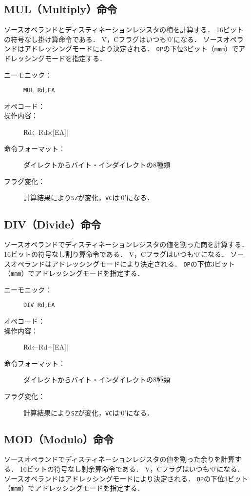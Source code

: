 \subsection{MUL（Multiply）命令}
ソースオペランドとディスティネーションレジスタの積を計算する．
16ビットの符号なし掛け算命令である．
V，Cフラグはいつも`0'になる．
ソースオペランドはアドレッシングモードにより決定される．
\texttt{OP}の下位3ビット（\texttt{mmm}）でアドレッシングモードを指定する．

\begin{description}
\item[ニーモニック：] \texttt{MUL Rd,EA}
\item[オペコード：] 
\item[操作内容：] \|Rd←Rd×[EA]|
\item[命令フォーマット：] ダイレクトからバイト・インダイレクトの8種類
\item[フラグ変化：] 計算結果により\texttt{SZ}が変化，\texttt{VC}は`0'になる．
\end{description}

\subsection{DIV（Divide）命令}
ソースオペランドでディスティネーションレジスタの値を割った商を計算する．
16ビットの符号なし割り算命令である．
V，Cフラグはいつも`0'になる．
ソースオペランドはアドレッシングモードにより決定される．
\texttt{OP}の下位3ビット（\texttt{mmm}）でアドレッシングモードを指定する．

\begin{description}
\item[ニーモニック：] \texttt{DIV Rd,EA}
\item[オペコード：] 
\item[操作内容：] \|Rd←Rd÷[EA]|
\item[命令フォーマット：] ダイレクトからバイト・インダイレクトの8種類
\item[フラグ変化：] 計算結果により\texttt{SZ}が変化，\texttt{VC}は`0'になる．
\end{description}

\subsection{MOD（Modulo）命令}
ソースオペランドでディスティネーションレジスタの値を割った余りを計算する．
16ビットの符号なし剰余算命令である．
V，Cフラグはいつも`0'になる．
ソースオペランドはアドレッシングモードにより決定される．
\texttt{OP}の下位3ビット（\texttt{mmm}）でアドレッシングモードを指定する．

